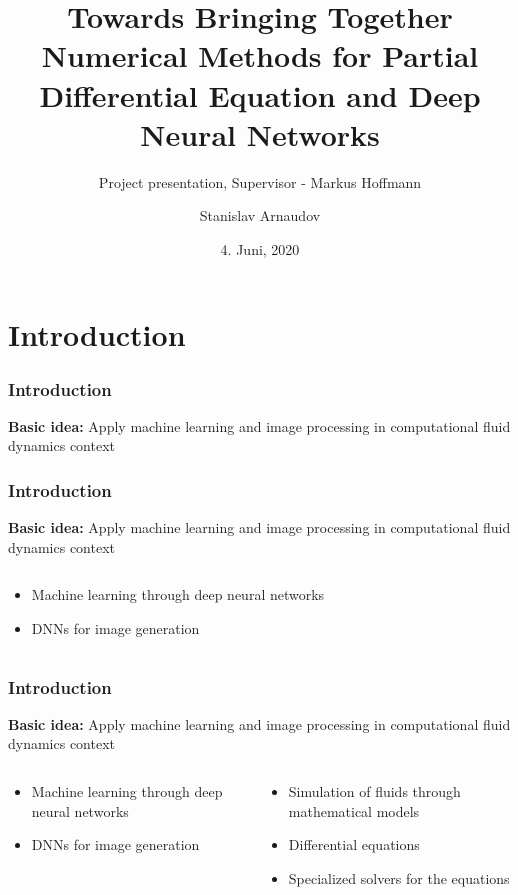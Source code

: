 \documentclass[18pt]{beamer}
\title[Project discussion]{Towards Bringing Together Numerical Methods for Partial Differential Equation and Deep Neural Networks}
\subtitle{Project presentation, Supervisor - Markus Hoffmann}
\author{Stanislav Arnaudov}
\institute{Chair for Computer Architecture and Parallel Processing}
\date{4. Juni, 2020}
\begin{document}
\begin{frame}
 \titlepage
\end{frame}

\section{Introduction}


\begin{frame}[t]
  \frametitle{Introduction}
  \textbf{Basic idea:} Apply machine learning and image processing in computational fluid dynamics context  
\end{frame}

\begin{frame}[t]
  \frametitle{Introduction}
  \textbf{Basic idea:} Apply machine learning and image processing in computational fluid dynamics context

  \begin{columns}[t]
    \begin{column}{0.5\textwidth}

      \begin{itemize}
      \item Machine learning through deep neural networks
      \item DNNs for image generation  
      \end{itemize}
      
    \end{column}
    \begin{column}{0.5\textwidth}
      
    \end{column}
  \end{columns}  
\end{frame}

\begin{frame}[t]
  \frametitle{Introduction}
  \textbf{Basic idea:} Apply machine learning and image processing in computational fluid dynamics context

  \begin{columns}[t]
    \begin{column}{0.5\textwidth}

      \begin{itemize}
      \item Machine learning through deep neural networks
      \item DNNs for image generation  
      \end{itemize}
      
    \end{column}
    \begin{column}{0.5\textwidth}

      \begin{itemize}
      \item Simulation of fluids through mathematical models
      \item Differential equations
      \item Specialized solvers for the equations
      \end{itemize}
      
    \end{column}
  \end{columns}  
\end{frame}
\end{document}
